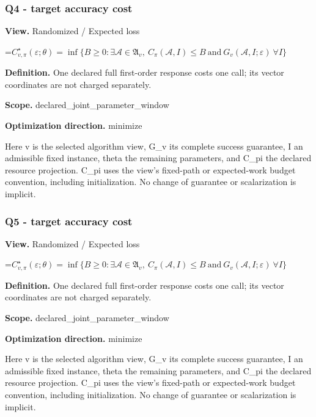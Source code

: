 \documentclass[10pt,a4paper]{article}
\newcommand{\AtlasMath}[1]{\par\begingroup\centering\setbox0=\hbox{$\displaystyle #1$}\ifdim\wd0>1.4\linewidth\typeout{ATLAS WIDE FORMULA: \the\wd0}\fi\ifdim\wd0>\linewidth\resizebox{\linewidth}{!}{\box0}\else\box0\fi\par\endgroup}
\begin{document}
\subsubsection{Q4 - target accuracy cost}


\textbf{View.} Randomized / Expected loss



\AtlasMath{C^\star_{v,\pi}(\varepsilon;\theta)=\inf\{B\ge0:\exists\mathcal A\in\mathfrak A_v,\ C_\pi(\mathcal A,I)\le B\ \text{and}\ G_v(\mathcal A,I;\varepsilon)\ \forall I\}}


\textbf{Definition.} One declared full first-order response costs one call; its vector coordinates are not charged separately.



\textbf{Scope.} declared\_joint\_parameter\_window



\textbf{Optimization direction.} minimize



Here v is the selected algorithm view, G\_v its complete success guarantee, I an admissible fixed instance, theta the remaining parameters, and C\_pi the declared resource projection. C\_pi uses the view's fixed-path or expected-work budget convention, including initialization. No change of guarantee or scalarization is implicit.



\subsubsection{Q5 - target accuracy cost}


\textbf{View.} Randomized / Expected loss



\AtlasMath{C^\star_{v,\pi}(\varepsilon;\theta)=\inf\{B\ge0:\exists\mathcal A\in\mathfrak A_v,\ C_\pi(\mathcal A,I)\le B\ \text{and}\ G_v(\mathcal A,I;\varepsilon)\ \forall I\}}


\textbf{Definition.} One declared full first-order response costs one call; its vector coordinates are not charged separately.



\textbf{Scope.} declared\_joint\_parameter\_window



\textbf{Optimization direction.} minimize



Here v is the selected algorithm view, G\_v its complete success guarantee, I an admissible fixed instance, theta the remaining parameters, and C\_pi the declared resource projection. C\_pi uses the view's fixed-path or expected-work budget convention, including initialization. No change of guarantee or scalarization is implicit.
\end{document}

